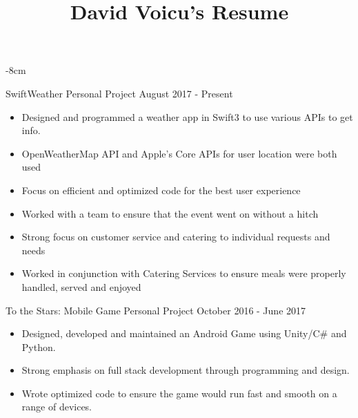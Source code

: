 \documentclass[10pt,a4paper]{altacv}
\begin{document}
\title{David Voicu's Resume}

\begin{adjustwidth}{}{-8cm}
\makecvheader
\end{adjustwidth}


\cvproject
	{SwiftWeather}
    {Personal Project}
    {August 2017 - Present}
\begin{itemize}
	\item {Designed and programmed a weather app in Swift3 to use various APIs to get info.}
    \item {OpenWeatherMap API and Apple’s Core APIs for user location were both used}
    \item {Focus on efficient and optimized code for the best user experience}
\end{itemize}

\divider


\begin{itemize}
\item Worked with a team to ensure that the event went on without a hitch
\item Strong focus on customer service and catering to individual requests and needs
\item Worked in conjunction with Catering Services to ensure meals were properly handled, served and enjoyed
\end{itemize}

\divider

\cvproject
	{To the Stars: Mobile Game}
    {Personal Project}
    {October 2016 - June 2017}
\begin{itemize}
	\item {Designed, developed and maintained an Android Game using Unity/C\# and Python.}
    \item {Strong emphasis on full stack development through programming and design.}
    \item {Wrote optimized code to ensure the game would run fast and smooth on a range of devices.}
\end{itemize}
\end{document}
